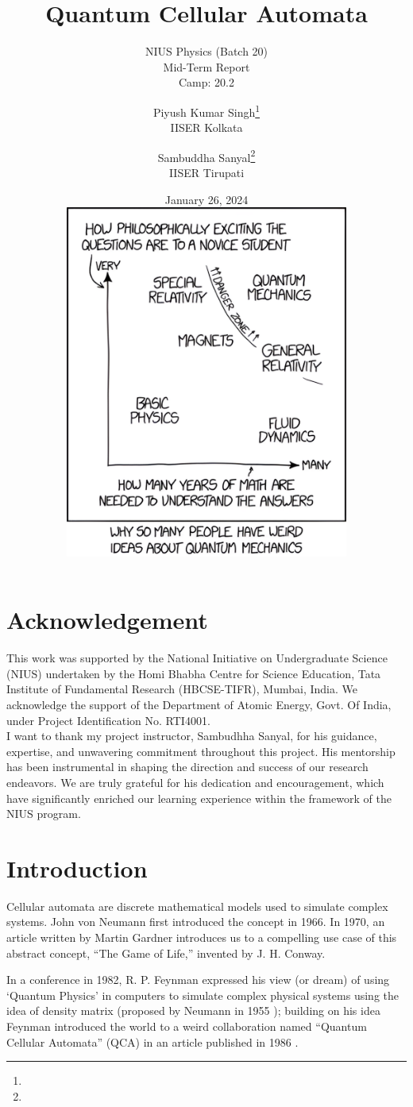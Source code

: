 \documentclass[11pt, oneside, listof=totoc]{scrbook}
\title{Quantum Cellular Automata}
\subtitle{NIUS Physics (Batch 20) \\ Mid-Term Report \\ Camp: 20.2}
\author{
    Piyush Kumar Singh\thanks{\mailto{pks22ms027@iiserkol.ac.in}} \\ {\large IISER Kolkata} 
    \and
    Sambuddha Sanyal\thanks{\mailto{sambuddha.sanyal@iisertirupati.ac.in}} \\ {\large IISER Tirupati}
}
\date{
    January 26, 2024\\[3ex]
    \includegraphics[width = 0.7\textwidth]{quantum-xkcd-better.png}
}
\begin{document}
\frontmatter
\begin{titlepage}
    \let\newpage\relax%
    \singhtitle
\end{titlepage}

\chapter*{Acknowledgement}

{\large\noindent
    This work was supported by the National Initiative on Undergraduate Science (NIUS) undertaken
    by the Homi Bhabha Centre for Science Education, Tata Institute of Fundamental Research
    (HBCSE-TIFR), Mumbai, India. We acknowledge the support of the Department of Atomic
    Energy, Govt. Of India, under Project Identification No. RTI4001.\\

    I want to thank my project instructor, Sambudhha Sanyal, for his guidance, expertise, and unwavering commitment throughout this project. His mentorship has been instrumental in shaping the direction and success of our research endeavors. We are truly grateful for his dedication and encouragement, which have significantly enriched our learning experience within the framework of the NIUS program.
}

\tableofcontents
\lstlistoflistings

\mainmatter

\chapter{Introduction}


Cellular automata are discrete mathematical models used to simulate complex systems. John von Neumann first introduced the concept \cite{Neumann1966} in 1966. In 1970, an article written by Martin Gardner \cite{Gardner1970} introduces us to a compelling use case of this abstract concept, ``The Game of Life,'' invented by J. H. Conway.


In a conference in 1982, R. P. Feynman expressed his view (or dream) of using `Quantum Physics' in computers \cite{Feynman1982} to simulate complex physical systems using the idea of density matrix (proposed by Neumann in 1955 \cite{Neumann2018}); building on his idea Feynman introduced the world to a weird collaboration named ``Quantum Cellular Automata'' (QCA) in an article published in 1986 \cite{Feynman1986}.
\end{document}
